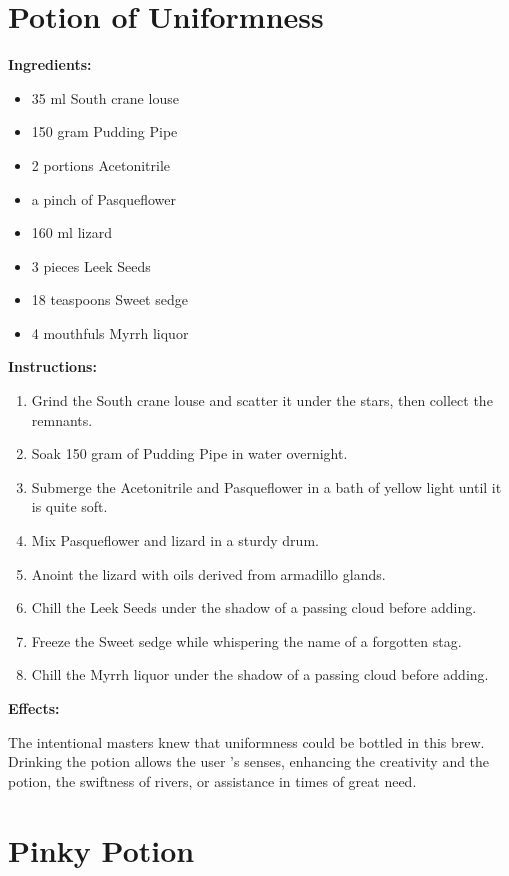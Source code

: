 \documentclass{article}
\begin{document}
\newpage
\section*{Potion of Uniformness}

\textbf{Ingredients:}

\begin{itemize}
  \item 35 ml South crane louse
  \item 150 gram Pudding Pipe
  \item 2 portions Acetonitrile
  \item a pinch of Pasqueflower
  \item 160 ml lizard
  \item 3 pieces Leek Seeds
  \item 18 teaspoons Sweet sedge
  \item 4 mouthfuls Myrrh liquor
\end{itemize}

\textbf{Instructions:}

\begin{enumerate}
  \item Grind the South crane louse and scatter it under the stars, then collect the remnants.
  \item Soak 150 gram of Pudding Pipe in water overnight.
  \item Submerge the Acetonitrile and Pasqueflower in a bath of yellow light until it is quite soft.
  \item Mix Pasqueflower and lizard in a sturdy drum.
  \item Anoint the lizard with oils derived from armadillo glands.
  \item Chill the Leek Seeds under the shadow of a passing cloud before adding.
  \item Freeze the Sweet sedge while whispering the name of a forgotten stag.
  \item Chill the Myrrh liquor under the shadow of a passing cloud before adding.
\end{enumerate}

\textbf{Effects:}

The intentional masters knew that uniformness could be bottled in this brew. Drinking the potion allows the user 's senses, enhancing the creativity and the potion, the swiftness of rivers, or assistance in times of great need.

\newpage
\section*{Pinky Potion}
\end{document}
